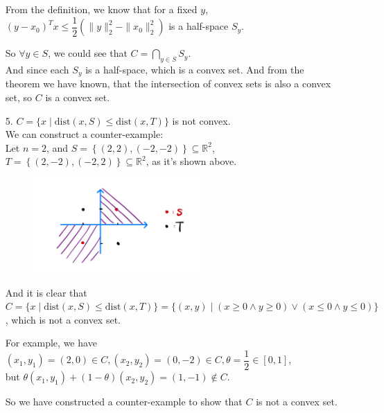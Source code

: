 \begin{itemize}
From the definition, we know that for a fixed $y$,
$(y-x_0)^Tx \leq \dfrac{1}{2}\left(\|y\|_2^2-\|x_0\|_2^2\right)$ is a half-space $S_{y}$.

So $\forall y\in S$, we could see that $C=\bigcap\limits_{y\in S}S_{y}$.\\
And since each $S_{y}$ is a half-space, which is a convex set. And from the theorem we have known, that
the intersection of convex sets is also a convex set, so $C$ is a convex set.

\item[5.] $C=\{x \mid \text{dist}(x, S) \leq \text{dist}(x, T)\}$ is not convex. \\
We can construct a counter-example: \\
Let $n=2$, and $S=\left\{(2,2),(-2,-2)\right\}\subseteq\mathbb{R}^2$, $T=\left\{(2,-2),(-2,2)\right\}\subseteq\mathbb{R}^2$, as it's shown above.

\begin{figure}[htbp]
    \centering
    \includegraphics[width=0.6\textwidth]{../counter_example.png}
\end{figure}

And it is clear that $C=\{x \mid \text{dist}(x, S) \leq \text{dist}(x, T)\}=\{(x,y)\mid (x\geq 0\land y\geq 0)\lor(x\leq 0\land y\leq 0)\}$, which is not a convex set.

For example, we have $(x_1,y_1)=(2,0)\in C, (x_2,y_2)=(0,-2)\in C, \theta=\dfrac{1}{2}\in[0,1]$, \\ but $\theta(x_1,y_1)+(1-\theta)(x_2,y_2)=(1,-1)\notin C$.

So we have constructed a counter-example to show that $C$ is not a convex set.

\end{itemize}

\newpage
